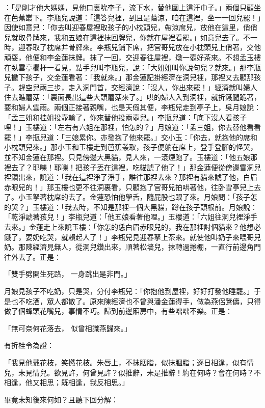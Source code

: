 \begin{showcontents}{}
：「是剛才他大媽媽，見他口裏吮李子，流下水，替他圍上這汗巾子。」兩個只顧坐在芭蕉叢下。李瓶兒說道：「這答兒裡，到且是蔭涼，咱在這裡，坐一一回兒罷！」因使如意兒：「你去叫迎春屋裡取孩子的小枕頭兒，帶涼席兒，放他在這里，俏俏兒就取骨牌來，我和五娘在這裡抹回牌兒，你就在屋裡看罷。」如意兒去了。不一時，迎春取了枕席并骨牌來。李瓶兒鋪下席，把官哥兒放在小枕頭兒上俏著，交他頑耍，他便和李金蓮抹牌。抹了一回，交迎春往屋裡，燉一壺好茶來。不想孟玉樓在臥雲亭欄杆一看見，點手兒叫李瓶兒，說：「大姐姐叫你說句兒？就來。」那李瓶兒撇下孩子，交金蓮看著：「我就來。」那金蓮記掛經濟在洞兒裡，那裡又去顧那孩子。趕空兒兩三步，走入洞門首，交經濟說：「沒人，你出來罷！」經濟就叫婦人住去瞧蘑菇：「裏面長出這些大頭蘑菇來了。」哄的婦人入到洞裡，就折鐵腿跪著，要和婦人雲雨。兩個正接著親嘴，也是天假其便，李瓶兒走到亭子上，吳月娘說：「孟三姐和桂姐投壺輸了，你來替他投兩壺兒。」李瓶兒道：「底下沒人看孩子哩！」玉樓道：「左右有六姐在那裡，怕怎的？」月娘道：「孟三姐，你去替他看看罷！」李瓶兒道：「三娘累你。亦發抱了他來罷。」交小玉：「你去，就抱他的席和小枕頭兒來。」那小玉和玉樓走到芭蕉叢取，孩子便躺在席上，登手登腳的怪哭，並不知金蓮在那裡。只見傍邊大黑貓，見人來，一滾煙跑了。玉樓道：「他五娘那裡去了？耶嚛！耶嚛！把孩子丟在這裡，吃貓諕了他了！」那金蓮便從傍邊雪洞兒裡鑽出來，說道：「我在這裡淨了淨手，誰往那裡去來？那裡有貓來諕了他，白眉赤眼兒的！」那玉樓也更不往洞裏看，只顧抱了官哥兒拍哄著他，往卧雪亭兒上去了。小玉拏著枕席的去了。金蓮恐怕他學舌，隨屁股也跟了來。月娘問：「孩子怎的哭？」玉樓道：「我去時，不知是那裡一個大黑貓，蹲在孩子頭根前。月娘說：「乾淨諕著孩兒！」李瓶兒道：「他五娘看著他哩。」玉樓道：「六姐往洞兒裡淨手去來。」金蓮走上來說玉樓：「你怎的恁白眉赤眼兒的，我在那裡討個貓來？他想必餓了，要奶吃哭，就賴起人了！」李瓶兒見迎春拏上茶來。就使他叫奶子來喂哥兒奶。那陳經濟見無人，從洞兒鑽出來，順著松墻兒，抹轉過捲棚，一直行前邊角門往外去了。正是：

「雙手劈開生死路，  一身跳出是非門。」

月娘見孩子不吃奶，只是哭，分付李瓶兒：「你抱他到屋裡，好好打發他睡罷。」于是也不吃酒，眾人都散了。原來陳經濟也不曾與潘金蓮得手，做為燕侶鶯儔，只得做了個蜂頭花嘴兒，事情不巧。歸到前邊廂房中，有些咄咄不樂。正是：

「無可奈何花落去，  似曾相識燕歸來。」

有折桂令為證：

「我見他戴花枝，笑撚花枝。朱唇上，不抹胭脂，似抹胭脂；逐日相逢，似有情兒，未見情兒。欲見許，何曾見許？似推辭，未是推辭！約在何時？會在何時？不相逢，他又相思；既相逢，我反相思。」

畢竟未知後來何如？且聽下回分解：




\end{showcontents}


